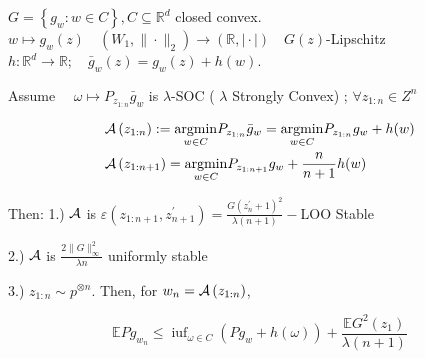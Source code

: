 \documentclass[twoside]{article}
\begin{document}
\begin{theorem}

$G=\left\{g_{w}: w \in C\right\}, C \subseteq \mathbb{R}^{d}$ closed  convex. 
$w \mapsto g_{w}(z) \quad\left(W_{1}, \|\cdot\|_{2}\right) \rightarrow \left(\mathbb{R} ,  \mid \cdot \mid \right) \quad G(z)$-Lipschitz \\ $h: \mathbb{R}^{d} \rightarrow \mathbb{R} ; \quad \bar{g}_{w}(z)=g_{w}(z)+h(w)$.

\noindent Assume $\quad \omega \mapsto P_{z_{1: n}} \bar{g}_{w}$ is $\lambda$-SOC ( $\lambda$ Strongly Convex) ; $\forall z_{1: n} \in Z^{n}$

$$
\begin{aligned}
& \mathcal{A} \left(z_{1: n}\right):=\underset{w \in C}{\operatorname{argmin}} P_{z_{1:n}} \bar{g}_{w}=\underset{w \in C}{\operatorname{argmin}} P_{z_{1:n}} g_{w}+h(w) \\
& \mathcal{A} \left(z_{1: n+1}\right)=\underset{w \in C}{\operatorname{argmin}} P_{z_{1: n+1}} g_{w}+\frac{n}{n+1} h(w)
\end{aligned}
$$

Then: 
1.) $\mathcal{A}$ is $\varepsilon\left(z_{1: n+1}, z_{n+1}^{\prime}\right)=\frac{G\left(z_{n}^{\prime}+1\right)^{2}}{\lambda(n+1)}-$LOO Stable

2.) $\mathcal{A}$ is $\frac{2\|G\|_{\infty}^{2}}{\lambda n}$ uniformly stable

3.) $z_{1: n} \sim p^{\otimes n}$. Then, for $w_{n}=\mathcal{A}\left(z_{1: n}\right)$,

$$
\mathbb{E} P g_{w_{n}} \leqslant \operatorname{iuf}_{\omega \in C}\left(P g_{w}+h(\omega)\right)+\frac{\mathbb{E} G^2\left(z_{1}\right)}{\lambda(n+1)}
$$

\end{theorem}
\end{document}
